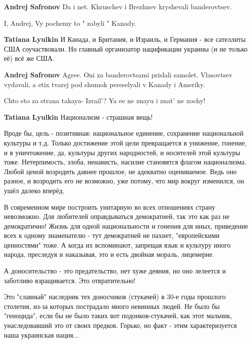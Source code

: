 \begin{itemize}
\begin{itemize}
\textbf{Andrej Safronov} Da i net. Khruschev i Brezhnev kryshevali banderovtsev.

I, Andrej, Vy pochemy to " zabyli " Kanady.

\textbf{Tatiana Lyulkin} И Канада, и Британия, и Израиль, и Германия - все сателлиты США соучаствовали. Но главный организатор нацификации украины (и не только её) всё же США.

\textbf{Andrej Safronov} Agree. Oni za banderovtsami prislali samolet. Vlasovtsev vydavali, a etix tvarej pod shumok pereselyali v Kanady i Ameriky.


Chto eto za strana takaya- Izrail'? Ya ee ne znayu i znat' ne xochy!

\textbf{Tatiana Lyulkin}
Национализм - страшная вещь!

Вроде бы, цель - позитивная: национальное единение, сохранение национальной
культуры и т.д. Только достижение этой цели превращается в унижение, гонение, и
в уничтожение, да, культуры других народностей, и носителей этой культуры тоже.
Нетерпимость, злоба, ненависть, насилие становятся флагом национализма. Любой
ценой возродить давнее прошлое, не адекватно оцениваемое. Ведь оно разное, и
возродить его не возможно, уже потому, что мир вокруг изменился, он ушёл далеко
вперёд.

В современном мире построить унитарную во всех отношениях страну невозможно.
Для любителей оправдываться демократией, так это как раз не демократично! Жизнь
для одной национальности и гонения для иных, приведение всех к одному
знаменателю - тут демократией не пахнет, "европейскими ценностями" тоже. А
когда их вспоминают, запрещая язык и культуру иного народа, преследуя и
наказывая, это и есть двойная мораль, лицемерие.

А доносительство - это предательство, нет хуже деяния, но оно лелеется и
заботливо взращивается. Это отвратительно!

\end{itemize} %


Это "славный" наследник тех доносчиков (стукачей) в 30-е годы прошлого
столетия, из-за которых пострадало много невинных людей. Не было бы "геноцида",
если бы не было таких вот подонков-стукачей, как этот мальчик, унаследовавший
это от своих предков. Горько, но факт - этим характеризуется наша украинская
нация...



\end{itemize}
